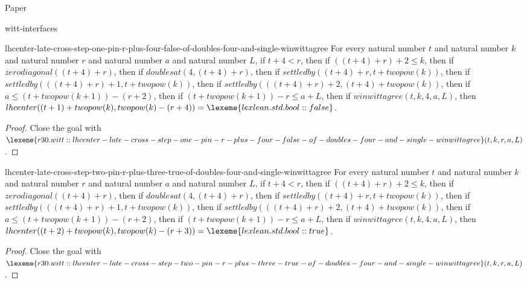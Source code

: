\begin{lexlean}{Paper}
\begin{section}{witt-interfaces}
  \begin{theorem}{lhcenter-late-cross-step-one-pin-r-plus-four-false-of-doubles-four-and-single-winwittagree}
  For every natural number \(t\) and natural number \(k\) and natural number \(r\) and natural number \(a\) and natural number \(L\), if \(t + 4 < r\), then if \(((t + 4) + r) + 2 ≤ k\), then if \(zerodiagonal((t + 4) + r)\), then if \(doublesat(4, (t + 4) + r)\), then if \(settledby((t + 4) + r, t + twopow(k))\), then if \(settledby(((t + 4) + r) + 1, t + twopow(k))\), then if \(settledby(((t + 4) + r) + 2, (t + 4) + twopow(k))\), then if \(a ≤ (t + twopow(k + 1)) - (r + 2)\), then if \((t + twopow(k + 1)) - r ≤ a + L\), then if \(winwittagree(t, k, 4, a, L)\), then \(lhcenter((t + 1) + twopow(k), twopow(k) - (r + 4)) = \lexeme{lexlean.std.bool::false}\).
  \begin{proof}
  Close the goal with \(\lexeme{r30.witt::lhcenter-late-cross-step-one-pin-r-plus-four-false-of-doubles-four-and-single-winwittagree}(t, k, r, a, L)\).
  \end{proof}
  \end{theorem}

  \begin{theorem}{lhcenter-late-cross-step-two-pin-r-plus-three-true-of-doubles-four-and-single-winwittagree}
  For every natural number \(t\) and natural number \(k\) and natural number \(r\) and natural number \(a\) and natural number \(L\), if \(t + 4 < r\), then if \(((t + 4) + r) + 2 ≤ k\), then if \(zerodiagonal((t + 4) + r)\), then if \(doublesat(4, (t + 4) + r)\), then if \(settledby((t + 4) + r, t + twopow(k))\), then if \(settledby(((t + 4) + r) + 1, t + twopow(k))\), then if \(settledby(((t + 4) + r) + 2, (t + 4) + twopow(k))\), then if \(a ≤ (t + twopow(k + 1)) - (r + 2)\), then if \((t + twopow(k + 1)) - r ≤ a + L\), then if \(winwittagree(t, k, 4, a, L)\), then \(lhcenter((t + 2) + twopow(k), twopow(k) - (r + 3)) = \lexeme{lexlean.std.bool::true}\).
  \begin{proof}
  Close the goal with \(\lexeme{r30.witt::lhcenter-late-cross-step-two-pin-r-plus-three-true-of-doubles-four-and-single-winwittagree}(t, k, r, a, L)\).
  \end{proof}
  \end{theorem}


\end{section}
\end{lexlean}
